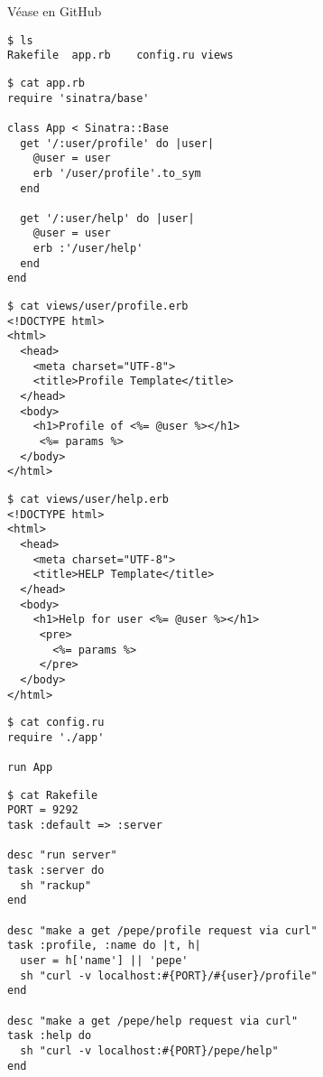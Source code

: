 Véase en GitHub 

\begin{verbatim}
$ ls
Rakefile  app.rb    config.ru views
\end{verbatim}

\begin{verbatim}
$ cat app.rb 
require 'sinatra/base'

class App < Sinatra::Base
  get '/:user/profile' do |user|
    @user = user
    erb '/user/profile'.to_sym
  end

  get '/:user/help' do |user|
    @user = user
    erb :'/user/help'
  end
end
\end{verbatim}

\begin{verbatim}
$ cat views/user/profile.erb 
<!DOCTYPE html>
<html> 
  <head>
    <meta charset="UTF-8">
    <title>Profile Template</title> 
  </head>
  <body> 
    <h1>Profile of <%= @user %></h1>
     <%= params %>
  </body> 
</html>
\end{verbatim}


\begin{verbatim}
$ cat views/user/help.erb 
<!DOCTYPE html>
<html> 
  <head>
    <meta charset="UTF-8">
    <title>HELP Template</title> 
  </head>
  <body> 
    <h1>Help for user <%= @user %></h1>
     <pre>
       <%= params %>
     </pre>
  </body> 
</html>
\end{verbatim}

\begin{verbatim}
$ cat config.ru 
require './app'

run App
\end{verbatim}

\begin{verbatim}
$ cat Rakefile 
PORT = 9292
task :default => :server

desc "run server"
task :server do
  sh "rackup"
end

desc "make a get /pepe/profile request via curl"
task :profile, :name do |t, h|
  user = h['name'] || 'pepe'
  sh "curl -v localhost:#{PORT}/#{user}/profile"
end

desc "make a get /pepe/help request via curl"
task :help do 
  sh "curl -v localhost:#{PORT}/pepe/help"
end
\end{verbatim}

